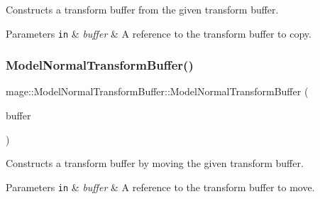 Constructs a transform buffer from the given transform buffer.


\begin{DoxyParams}[1]{Parameters}
\mbox{\tt in}  & {\em buffer} & A reference to the transform buffer to copy. \\
\hline
\end{DoxyParams}
\hypertarget{structmage_1_1_model_normal_transform_buffer_a415530ed6d4a2bd31424b11af6b1ebee}{}\label{structmage_1_1_model_normal_transform_buffer_a415530ed6d4a2bd31424b11af6b1ebee} 
\subsubsection{\texorpdfstring{Model\+Normal\+Transform\+Buffer()}{ModelNormalTransformBuffer()}\hspace{0.1cm}{\footnotesize\ttfamily [3/3]}}
{\footnotesize\ttfamily mage\+::\+Model\+Normal\+Transform\+Buffer\+::\+Model\+Normal\+Transform\+Buffer (\begin{DoxyParamCaption}\item[{\hyperlink{structmage_1_1_model_normal_transform_buffer}{Model\+Normal\+Transform\+Buffer} \&\&}]{buffer }\end{DoxyParamCaption})\hspace{0.3cm}{\ttfamily [default]}}

Constructs a transform buffer by moving the given transform buffer.


\begin{DoxyParams}[1]{Parameters}
\mbox{\tt in}  & {\em buffer} & A reference to the transform buffer to move. \\
\hline
\end{DoxyParams}
\hypertarget{structmage_1_1_model_normal_transform_buffer_a157d1f7cc47463f6b589d25c039ec418}{}\label{structmage_1_1_model_normal_transform_buffer_a157d1f7cc47463f6b589d25c039ec418} 

